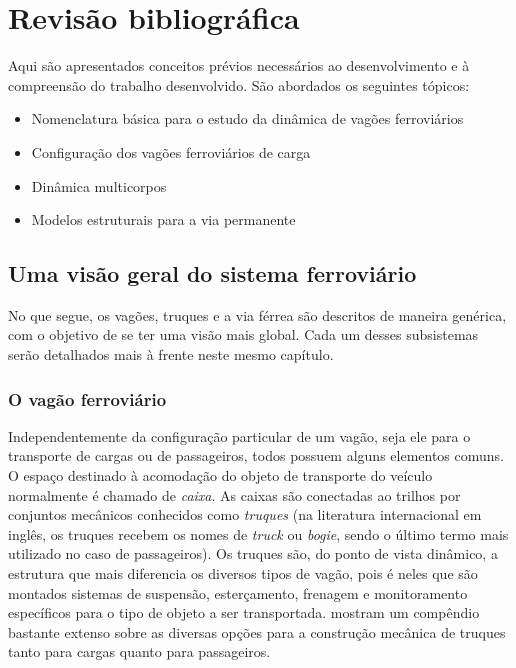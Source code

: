 \chapter{Revisão bibliográfica\label{cap: revisao}}

Aqui são apresentados conceitos prévios necessários ao desenvolvimento e à compreensão do trabalho desenvolvido. São abordados os seguintes tópicos:

\begin{itemize}
 \item Nomenclatura básica para o estudo da dinâmica de vagões ferroviários
 \item Configuração dos vagões ferroviários de carga
 \item Dinâmica multicorpos
 \item Modelos estruturais para a via permanente
\end{itemize}


\section{Uma visão geral do sistema ferroviário}

No que segue, os vagões, truques e a via férrea são descritos de maneira genérica, com o objetivo de se ter uma visão mais global. Cada um desses subsistemas serão detalhados mais à frente neste mesmo capítulo.

\subsection{O vagão ferroviário}
Independentemente da configuração particular de um vagão, seja ele para o transporte de cargas ou de passageiros, todos possuem alguns elementos comuns. O espaço destinado à acomodação do objeto de transporte do veículo normalmente é chamado de \textit{caixa}. As caixas são conectadas ao trilhos por conjuntos mecânicos conhecidos como \textit{truques} (na literatura internacional em inglês, os truques recebem os nomes de \textit{truck} ou \textit{bogie}, sendo o último termo mais utilizado no caso de passageiros). Os truques são, do ponto de vista dinâmico, a estrutura que mais diferencia os diversos tipos de vagão, pois é neles que são montados sistemas de suspensão, esterçamento, frenagem e monitoramento específicos para o tipo de objeto a ser transportada.  mostram um compêndio bastante extenso sobre as diversas opções para a construção mecânica de truques tanto para cargas quanto para passageiros.

